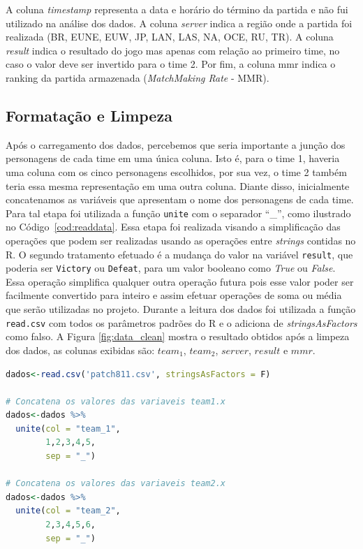 \documentclass[a4paper]{article}
\begin{document}
A coluna \textit{timestamp} representa a data e horário do término da partida e não fui utilizado na análise dos dados. A coluna \textit{server} indica a região onde a partida foi realizada (BR, EUNE, EUW, JP, LAN, LAS, NA, OCE, RU, TR). A coluna \textit{result} indica o resultado do jogo mas apenas com relação ao primeiro time, no caso o valor deve ser invertido para o time 2. Por fim, a coluna mmr indica o ranking da partida armazenada (\textit{MatchMaking Rate} - MMR). 

\subsection{Formatação e Limpeza}

Após o carregamento dos dados, percebemos que seria importante a junção dos personagens de cada time em uma única coluna. Isto é, para o time 1, haveria uma coluna com os cinco personagens escolhidos, por sua vez, o time 2 também teria essa mesma representação em uma outra coluna. Diante disso, inicialmente concatenamos as variáveis que apresentam o nome dos personagens de cada time. Para tal etapa foi utilizada a função \texttt{unite} com o separador “\_”, como ilustrado no Código~\ref{cod:readdata}. Essa etapa foi realizada visando a simplificação das operações que podem ser realizadas usando as operações entre \textit{strings} contidas no R. O segundo tratamento efetuado é a mudança do valor na variável \texttt{result}, que poderia ser \texttt{Victory} ou \texttt{Defeat}, para um valor booleano como \textit{True} ou \textit{False}. Essa operação simplifica qualquer outra operação futura pois esse valor poder ser facilmente convertido para inteiro e assim efetuar operações de soma ou média que serão utilizadas no projeto. Durante a leitura dos dados foi utilizada a função \texttt{read.csv} com todos os parâmetros padrões do R e o adiciona de \textit{stringsAsFactors} como falso. A Figura \ref{fig:data_clean} mostra o resultado obtidos após a limpeza dos dados, as colunas exibidas são: $team_1$, $team_2$, $server$, $result$ e $mmr$.

\begin{lstlisting}[language=R, caption={Leitura da base de dados},label={cod:readdata}]
dados<-read.csv('patch811.csv', stringsAsFactors = F)

# Concatena os valores das variaveis team1.x
dados<-dados %>%
  unite(col = "team_1",
        1,2,3,4,5,
        sep = "_")
        
# Concatena os valores das variaveis team2.x
dados<-dados %>%
  unite(col = "team_2",
        2,3,4,5,6,
        sep = "_")
\end{lstlisting}
\end{document}
